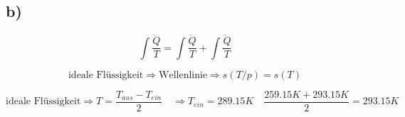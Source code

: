 

\subsection*{b)}
\[
\int \frac{\dot{Q}}{T} = \int \frac{\dot{Q}}{T} + \int \frac{\dot{Q}}{T}
\]

\[
\text{ideale Flüssigkeit} \Rightarrow \text{Wellenlinie} \Rightarrow s(T/p) = s(T)
\]

\[
\text{ideale Flüssigkeit} \Rightarrow T = \frac{T_{aus} - T_{ein}}{2} \quad \Rightarrow T_{ein} = 289.15 K \quad \frac{259.15 K + 293.15 K}{2} = 293.15 K
\]